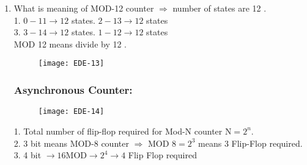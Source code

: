\begin{enumerate}
\item  	What is meaning of MOD-12 counter $\Rightarrow$ number of states are 12 .\\
1. $0-11 \rightarrow 12$ states. $2-13 \rightarrow 12$ states\\
3. $3-14 \rightarrow 12$ states. $1-12 \rightarrow 12$ states\\
 	MOD 12 means divide by 12 .
 	\begin{figure}[H]
 		\centering
 		\texttt{[image: EDE-13]}
 	\end{figure}
 \subsubsection{ Asynchronous Counter: }
 		\begin{figure}[H]
 		\centering
 		\texttt{[image: EDE-14]}
 	\end{figure}
 \begin{note}
 		1. Total number of flip-flop required for Mod-N counter $\mathrm{N}=2^{n}$.\\
 	2. 3 bit means MOD-8 counter $\Rightarrow$ MOD $8=2^{3}$ means 3 Flip-Flop required.\\
 	3. 4 bit $\rightarrow 16 \mathrm{MOD} \rightarrow 2^{4} \rightarrow 4$ Flip Flop required
 \end{note}

\end{enumerate}
